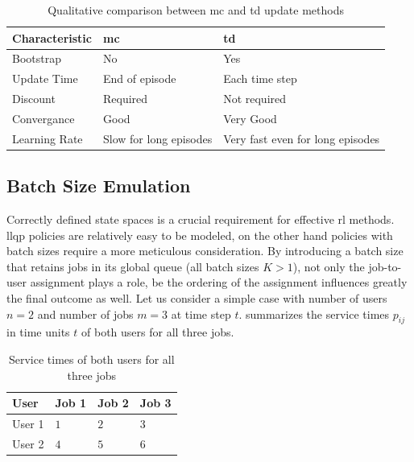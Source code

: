 \documentclass{seal_thesis}
\begin{document}
\begin{table}[!ht]
\centering
\begin{tabular}{@{}lll@{}}
\toprule
Characteristic & \gls{mc}                     & \gls{td}                               \\ \midrule
Bootstrap      & No                     & Yes                              \\
Update Time    & End of episode         & Each time step                   \\
Discount       & Required               & Not required                     \\
Convergance    & Good                   & Very Good                        \\
Learning Rate  & Slow for long episodes & Very fast even for long episodes \\ \bottomrule
\end{tabular}
\caption{Qualitative comparison between \gls{mc} and \gls{td} update methods \cite[p. 130]{Sutton2017}}
\label{tab:mc_td_comp}
\end{table}

\subsection{Batch Size Emulation}
\label{subsec:batch_size_emulation}

Correctly defined state spaces is a crucial requirement for effective \gls{rl} methods. \gls{llqp} policies are relatively easy to be modeled, on the other hand policies with batch sizes require a more meticulous consideration. By introducing a batch size that retains jobs in its global queue (\ie all batch sizes $K>1$), not only the job-to-user assignment plays a role, be the ordering of the assignment influences greatly the final outcome as well. Let us consider a simple case with number of users $n=2$ and number of jobs $m=3$ at time step $t$.  summarizes the service times $p_{ij}$ in time units $t$ of both users for all three jobs.

\begin{table}[!ht]
\centering
\begin{tabular}{@{}llll@{}}
\toprule
User   & Job 1 & Job 2 & Job 3 \\ \midrule
User 1 & $1$     & $2$     & $3$     \\
User 2 & $4$     & $5$     & $6$     \\ \bottomrule
\end{tabular}
\caption{Service times of both users for all three jobs}
\label{tab:users_service_times_example}
\end{table}
\end{document}
